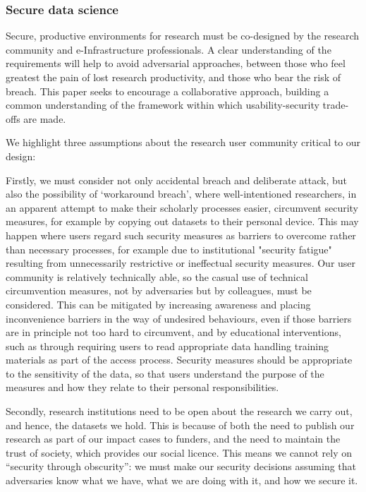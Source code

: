 \documentclass[10pt,a4paper,twocolumn]{article}
\begin{document}
\subsubsection{Secure data science}

Secure, productive environments for research must be co-designed by the research community and e-Infrastructure professionals.  A clear understanding of the requirements will help to avoid adversarial approaches, 
between those who feel greatest the pain of lost research productivity, and those who bear the risk of breach. 
This paper seeks to encourage a collaborative approach, building a common understanding of the framework within which usability-security trade-offs are made. 

We highlight three assumptions about the research user community critical to our design:

Firstly, we must consider not only accidental breach and deliberate attack, but also the possibility of `workaround breach', where
well-intentioned researchers, in an apparent attempt to make their scholarly processes easier, circumvent security measures, for example by copying out datasets to their personal device. This may happen where users regard such security measures as barriers to overcome rather than necessary processes, for example due to institutional "security fatigue" resulting from unnecessarily restrictive or ineffectual security measures. 
Our user community is relatively technically able, so the casual use of technical circumvention measures, not by adversaries but by
colleagues, must be considered.
This can be mitigated by increasing awareness and placing inconvenience barriers in the way of undesired behaviours, even if those barriers are in principle not too hard to circumvent, and by educational interventions, such as through requiring users to read appropriate data handling training materials as part of the access process. Security measures should be appropriate to the sensitivity of the data, so that users understand the purpose of the measures and how they relate to their personal responsibilities.

Secondly, research institutions need to be open about the research we carry out, and hence, the datasets we hold. This is because of both the need to 
publish our research as part of our impact cases to funders, and the need to maintain the trust of society, which provides our social licence. This means
we cannot rely on ``security through obscurity'': we must make our security decisions assuming that adversaries know what we have, what we are doing with it, and
how we secure it. 
\end{document}
